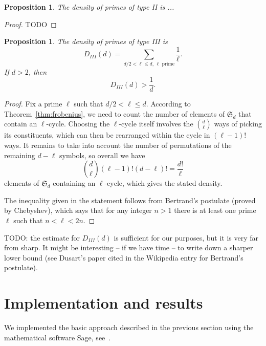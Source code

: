 \documentclass[11pt]{article}
\theoremstyle{plain}
\newtheorem{proposition}[theorem]{Proposition}
\theoremstyle{definition}
\theoremstyle{remark}
\numberwithin{equation}{section}
\numberwithin{table}{section}
\renewcommand{\SS}{\mathfrak{S}}
\begin{document}
\begin{proposition}
  The density of primes of type II is ...
\end{proposition}
\begin{proof}
  TODO
\end{proof}

\begin{proposition}
  The density of primes of type III is
  \begin{equation*}
    D_{III}(d)=\sum_{d/2<\ell\leq d, \,\ell\text{ prime}} \frac{1}{\ell}.
  \end{equation*}
  If $d>2$, then
  \begin{equation*}
    D_{III}(d)>\frac{1}{d}.
  \end{equation*}
\end{proposition}
\begin{proof}
  Fix a prime $\ell$ such that $d/2<\ell\leq d$.  According to
  Theorem~\ref{thm:frobenius}, we need to count the number of elements of
  $\SS_d$ that contain an $\ell$-cycle.  Choosing the $\ell$-cycle itself
  involves the $\binom{d}{\ell}$ ways of picking its constituents, which can
  then be rearranged within the cycle in $(\ell-1)!$ ways.  It remains to
  take into account the number of permutations of the remaining $d-\ell$ symbols,
  so overall we have
  \begin{equation*}
    \binom{d}{\ell}(\ell-1)!(d-\ell)!=\frac{d!}{\ell}
  \end{equation*}
  elements of $\SS_d$ containing an $\ell$-cycle, which gives the stated
  density.

  The inequality given in the statement follows from Bertrand's postulate
  (proved by Chebyshev), which says that for any integer $n>1$ there is at
  least one prime $\ell$ such that $n<\ell<2n$.
\end{proof}

TODO: the estimate for $D_{III}(d)$ is sufficient for our purposes, but it is
very far from sharp.  It might be interesting -- if we have time -- to write
down a sharper lower
bound (see Dusart's paper cited in the Wikipedia entry for Bertrand's
postulate).

\section{Implementation and results}
We implemented the basic approach described in the previous section
using the mathematical software Sage, see~\cite{Sage}.
\end{document}
